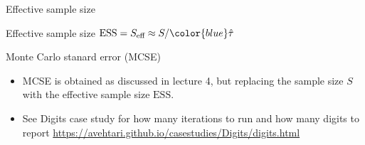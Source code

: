 \documentclass[finnish,english,t]{beamer}
\def\eff{\text{eff}}
\def\ESS{\text{ESS}}
\begin{document}
\begin{frame}
  
   {\Large\color{navyblue} Effective sample size}

   Effective sample size $\ESS = S_\eff \approx S/{\color{blue}\hat{\tau}}$\\
   
\end{frame}

\begin{frame}{Monte Carlo stanard error (MCSE)}

  \begin{itemize}
  \item MCSE is obtained as discussed in lecture 4, but replacing the
    sample size $S$ with the effective sample size $\ESS$.
  \item See Digits case study for how many iterations to run and how
    many digits to report
    \url{https://avehtari.github.io/casestudies/Digits/digits.html}
  \end{itemize}
  
\end{frame}
\end{document}
